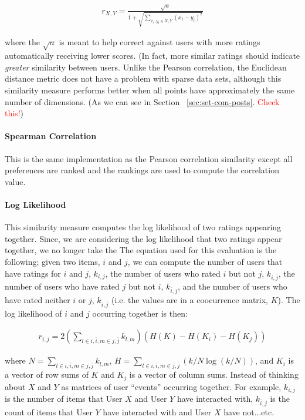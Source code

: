 \documentclass{article}
\begin{document}
\begin{align*}
r_{X, Y} = \frac{\sqrt{n}}{1 + \sqrt{\sum_{x_i, y_i \in X, Y} (x_i - y_i)^2}}
\end{align*}

where the $\sqrt{n}$ is meant to help correct against users with more ratings automatically receiving lower scores. 
(In fact, more similar ratings should indicate \emph{greater} similarity between users. Unlike the Pearson correlation,
the Euclidean distance metric does not have a problem with sparse data sets, although this similarity measure 
performs better when all points have approximately the same number of dimensions. (As we can see in Section
~\ref{sec:set-com-posts}. \textcolor{red}{Check this!})

\paragraph{Spearman Correlation}

This is the same implementation as the Pearson correlation similarity except all preferences are ranked and the 
rankings are used to compute the correlation value.

\paragraph{Log Likelihood}

This similarity measure computes the log likelihood of two ratings appearing together. Since, we are considering the log likelihood that two ratings appear together, we no longer take the The equation used for this evaluation is the following; given two items, $i$ and $j$, we can compute the number of users that have ratings for $i$ and $j$, $k_{i,j}$, the number of users
who rated $i$ but not $j$, $k_{i,\overline{j}}$, the number of users who have rated $j$ but
not $i$, $k_{\overline{i}, j}$, and the number of users who have rated neither $i$ or $j$, 
$k_{\overline{i}, \overline{j}}$ (i.e. the values are in a coocurrence matrix, $K$). 
The log likelihood of $i$ and $j$ occurring together is
then:

\begin{align*}
r_{i, j} = 2 \left(\sum_{l \in {i, \overline{i}}, m \in {j, \overline{j}}} k_{l, m} \right)(H(K) - H(K_i) - H(K_j))
\end{align*}

where $N = \sum_{l \in {i, \overline{i}}, m \in {j, \overline{j}}} k_{l, m}$, $H = \sum_{l \in {i, \overline{i}}, m \in {j, \overline{j}}}\left(k/N \log(k/N)\right)$, and $K_i$ is a vector of row sums of $K$ and $K_j$ is a vector of column sums. Instead of thinking about $X$ and $Y$ as matrices of user ``events'' occurring together. For example, $k_{i, j}$ is the number of items that
User $X$ and User $Y$ have interacted with, $k_{\overline{i}, j}$ is the count of items that User $Y$ have interacted
with and User $X$ have not...etc. 
\end{document}

